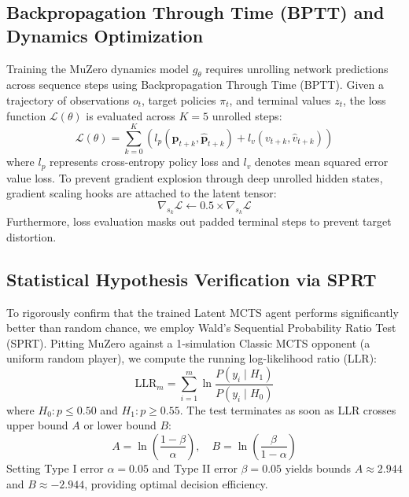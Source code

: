 \documentclass[12pt,a4paper]{article}
\begin{document}
\subsection{Backpropagation Through Time (BPTT) and Dynamics Optimization}
Training the MuZero dynamics model $g_\theta$ requires unrolling network predictions across sequence steps using Backpropagation Through Time (BPTT). Given a trajectory of observations $o_t$, target policies $\pi_t$, and terminal values $z_t$, the loss function $\mathcal{L}(\theta)$ is evaluated across $K=5$ unrolled steps:
\begin{equation}
    \mathcal{L}(\theta) = \sum_{k=0}^{K} \left( l_p(\mathbf{p}_{t+k}, \hat{\mathbf{p}}_{t+k}) + l_v(v_{t+k}, \hat{v}_{t+k}) \right)
\end{equation}
where $l_p$ represents cross-entropy policy loss and $l_v$ denotes mean squared error value loss. To prevent gradient explosion through deep unrolled hidden states, gradient scaling hooks are attached to the latent tensor:
\begin{equation}
    \nabla_{s_k} \mathcal{L} \gets 0.5 \times \nabla_{s_k} \mathcal{L}
\end{equation}
Furthermore, loss evaluation masks out padded terminal steps to prevent target distortion.

\subsection{Statistical Hypothesis Verification via SPRT}
To rigorously confirm that the trained Latent MCTS agent performs significantly better than random chance, we employ Wald's Sequential Probability Ratio Test (SPRT). Pitting MuZero against a 1-simulation Classic MCTS opponent (a uniform random player), we compute the running log-likelihood ratio (LLR):
\begin{equation}
    \text{LLR}_m = \sum_{i=1}^{m} \ln \frac{P(y_i \mid H_1)}{P(y_i \mid H_0)}
\end{equation}
where $H_0: p \le 0.50$ and $H_1: p \ge 0.55$. The test terminates as soon as LLR crosses upper bound $A$ or lower bound $B$:
\begin{equation}
    A = \ln \left( \frac{1 - \beta}{\alpha} \right), \quad B = \ln \left( \frac{\beta}{1 - \alpha} \right)
\end{equation}
Setting Type I error $\alpha = 0.05$ and Type II error $\beta = 0.05$ yields bounds $A \approx 2.944$ and $B \approx -2.944$, providing optimal decision efficiency.
\end{document}
